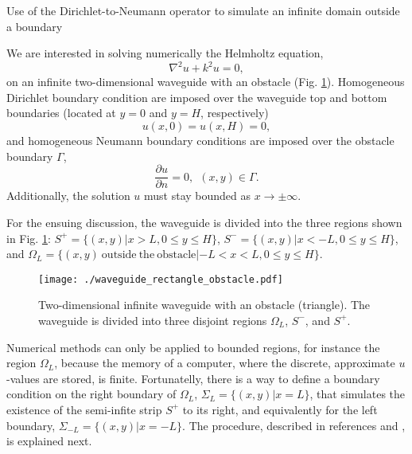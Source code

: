 \documentclass[11pt]{article}
\begin{document}
\begin{center}
{\Large Use of the Dirichlet-to-Neumann operator to simulate an infinite domain outside a boundary}
\end{center}
We are interested in solving numerically the Helmholtz equation,
\begin{equation}
  \label{eq:9}
  \nabla^2 u + k^2u = 0,
\end{equation}
on an infinite two-dimensional waveguide with an obstacle (Fig. \ref{fig:waveguide}). Homogeneous Dirichlet boundary condition are imposed over the waveguide top and bottom boundaries (located at $y=0$ and $y=H$, respectively)
\begin{equation}
  \label{eq:10}
  u(x,0) = u(x,H) = 0,
\end{equation}
and homogeneous Neumann boundary conditions are imposed over the obstacle boundary $\Gamma$,
\begin{equation}
  \label{eq:11}
  \frac{\partial u}{\partial n} = 0,~~(x,y) \in \Gamma.
\end{equation}
Additionally, the solution $u$ must stay bounded as $x \rightarrow \pm\infty$.

For the ensuing discussion, the waveguide is divided into the three regions shown in Fig. \ref{fig:waveguide}: $S^+ = \{(x,y)| x > L,  0 \le y \le H\}$, $S^- = \{(x,y)| x < -L,  0 \le y \le H\}$, and $\Omega_L = \{(x,y)~\mathrm{outside}~\mathrm{the}~\mathrm{obstacle}| -L < x < L, 0 \le y \le H\}$.
\begin{figure}[h]
  \centering
  \texttt{[image: ./waveguide\_rectangle\_obstacle.pdf]}
  \caption{Two-dimensional infinite waveguide with an obstacle (triangle). The waveguide is divided into three disjoint regions $\Omega_L$, $S^-$, and $S^+$.}
  \label{fig:waveguide}
\end{figure}

Numerical methods can only be applied to bounded regions, for instance the region $\Omega_L$, because the memory of a computer, where the discrete, approximate $u$-values are stored, is finite. Fortunatelly, there is a way to define a boundary condition on the right boundary of $\Omega_L$, $\Sigma_L = \{(x,y)|x=L\}$, that simulates the existence of the semi-infite strip $S^+$ to its right, and equivalently for the left boundary, $\Sigma_{-L} = \{(x,y)|x=-L\}$. The procedure, described in references  \cite{ihlenburg1998finite} and \cite{chesnel2025tutorial}, is explained next.
\end{document}
